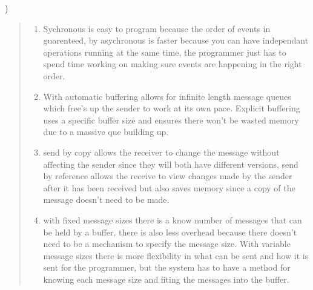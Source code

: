 \documentclass[11pt]{article}
\newenvironment{subquestion}[1]{#1) \begin{quote}}{\end{quote}}
\begin{document}
  \begin{subquestion}{3.18}
    \begin{enumerate}[label=\alph*]
      \item  Sychronous is easy to program because the order of events in guarenteed, by asychronous is faster because you can have independant operations running at the
      same time, the programmer just has to spend time working on making sure events are happening in the right order.
      \item  With automatic buffering allows for infinite length message queues which free's up the sender to work at its own pace. Explicit buffering
      uses a specific buffer size and ensures there won't be wasted memory due to a massive que building up.
      \item  send by copy allows the receiver to change the message without affecting the sender since they will both have different versions, send by reference
      allows the receive to view changes made by the sender after it has been received but also saves memory since a copy of the message doesn't need to be made.
      \item  with fixed message sizes there is a know number of messages that can be held by a buffer, there is also less overhead because there doesn't
      need to be a mechanism to specify the message size. With variable message sizes there is more flexibility in what can be sent and how it is sent for the
      programmer, but the system has to have a method for knowing each message size and fiting the messages into the buffer.
    \end{enumerate}
  \end{subquestion}
\end{document}
